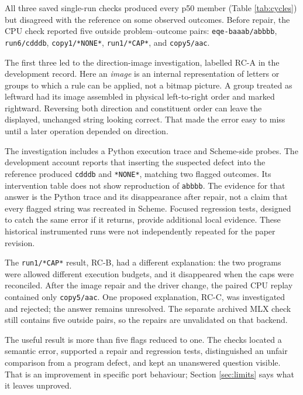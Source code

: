 \documentclass[10pt,letterpaper]{article}
\begin{document}
All three saved single-run checks produced every p50 member (Table \ref{tab:cycles}) but
disagreed with the reference on some observed outcomes. Before repair, the CPU check
reported five outside problem--outcome pairs: \texttt{eqe-baaab/abbbb},
\texttt{run6/cdddb}, \texttt{copy1/*NONE*}, \texttt{run1/*CAP*}, and \texttt{copy5/aac}.



The first three led to the direction-image investigation, labelled RC-A in the development
record. Here an \emph{image} is an internal representation of letters or groups to which a
rule can be applied, not a bitmap picture. A group treated as leftward had its image
assembled in physical left-to-right order and marked rightward. Reversing both direction
and constituent order can leave the displayed, unchanged string looking correct. That made
the error easy to miss until a later operation depended on direction.

The investigation includes a Python execution trace and Scheme-side probes. The
development account reports that inserting the suspected defect into the reference
produced \texttt{cdddb} and \texttt{*NONE*}, matching two flagged outcomes. Its
intervention table does not show reproduction of \texttt{abbbb}. The evidence for that
answer is the Python trace and its disappearance after repair, not a claim that every
flagged string was recreated in Scheme. Focused regression tests, designed to catch the
same error if it returns, provide additional local evidence. These historical instrumented
runs were not independently repeated for the paper revision.

The \texttt{run1/*CAP*} result, RC-B, had a different explanation: the two programs were
allowed different execution budgets, and it disappeared when the caps were reconciled.
After the image repair and the driver change, the paired CPU replay contained only
\texttt{copy5/aac}. One proposed explanation, RC-C, was investigated and rejected; the
answer remains unresolved. The separate archived MLX check still contains five outside
pairs, so the repairs are unvalidated on that backend.

The useful result is more than five flags reduced to one. The checks located a semantic
error, supported a repair and regression tests, distinguished an unfair comparison from a
program defect, and kept an unanswered question visible. That is an improvement in
specific port behaviour; Section \ref{sec:limits} says what it leaves unproved.
\end{document}
